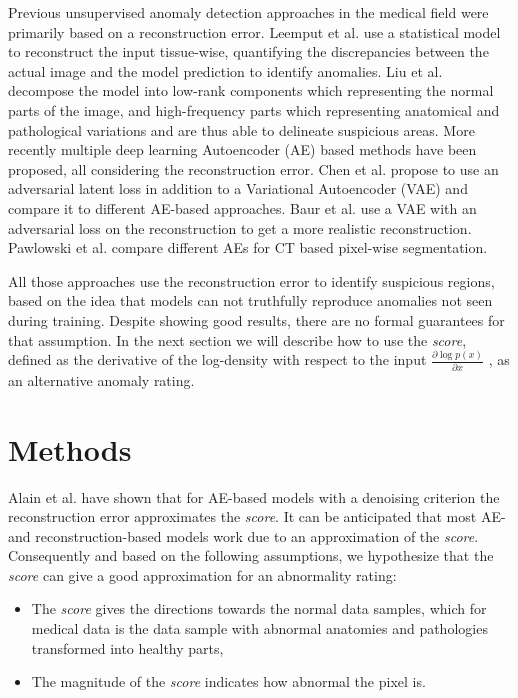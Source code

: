 \documentclass{article}
\begin{document}
Previous unsupervised anomaly detection approaches in the medical field were primarily based on a reconstruction error.
Leemput et al. \cite{van_leemput_automated_2001} use a statistical model to reconstruct the input tissue-wise, quantifying the discrepancies between the actual image and the model prediction to identify anomalies.
Liu et al. \cite{liu_low-rank_2014} decompose the model into low-rank components which representing the normal parts of the image, and high-frequency parts which representing anatomical and pathological variations and are thus able to delineate suspicious areas.
More recently multiple deep learning Autoencoder (AE) based methods have been proposed, all considering the reconstruction error.
Chen et al. \cite{chen_unsupervised_2018,chen_deep_2018} propose to use an adversarial latent loss in addition to a Variational Autoencoder (VAE) and compare it to different AE-based approaches. 
Baur et al. \cite{baur_deep_2018} use a VAE with an adversarial loss on the reconstruction to get a more realistic reconstruction.
Pawlowski et al. \cite{pawlowski_unsupervised_2018} compare different AEs for CT based pixel-wise segmentation.

All those approaches use the reconstruction error to identify suspicious regions, based on the idea that models can not truthfully reproduce anomalies not seen during training. 
Despite showing good results, there are no formal guarantees for that assumption. 
In the next section we will describe how to use the \textit{score}, defined as the derivative of the log-density with respect to the input $\frac{\partial \log p(x)}{\partial x}$  \cite{hyvarinen_estimation_2005}, as an alternative anomaly rating. 






\section{Methods}

Alain et al. \cite{alain_what_2014} have shown that for AE-based models with a denoising criterion the reconstruction error approximates the \textit{score}.
It can be anticipated that most AE- and reconstruction-based models work due to an approximation of the \textit{score}.
Consequently and based on the following assumptions, we hypothesize that the \textit{score} can give a good approximation for an abnormality rating:
\begin{itemize}
    \item The \textit{score} gives the directions towards the normal data samples, which for medical data is the data sample with abnormal anatomies and pathologies transformed into healthy parts,
    \item The magnitude of the \textit{score} indicates how abnormal the pixel is.
\end{itemize}
\end{document}

